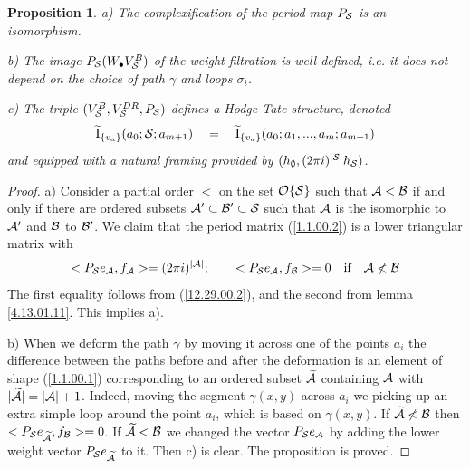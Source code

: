 \documentclass[10pt]{article}
\newtheorem{proposition}[theorem]{Proposition}
\begin{document}
\begin{proposition} \label{1.1.00.3} 
a) The complexification of the period map $P_{\cal S}$ is an isomorphism. 

b) The image $P_{{\cal S}}(W_{\bullet}{V}^{B}_{{\cal S}})$ of the weight 
filtration  is well defined,
i.e. it does not depend on the choice of path $\gamma$ and loops 
$\sigma_i$.

c) The triple $({V}^{B}_{{\cal S}}, {V}^{DR}_{{\cal S}}, P_{{\cal S}})$ defines a 
Hodge-Tate structure, 
denoted 
\begin{equation} \label{3.5.01.3}
\widetilde {\rm I}_{\{v_a\}}(a_0; {\cal S}; a_{m+1}) \quad = \quad 
\widetilde {\rm I}_{\{v_a\}}(a_0; a_1, ..., a_m; a_{m+1})
\end{equation}
 and equipped 
with a natural framing provided by $(h_{\emptyset}, (2\pi i)^{|{\cal S}|}h_{\cal S})$.
\end{proposition}

\begin{proof} a) Consider a partial order $<$ on the set ${\cal O}\{{\cal S}\}$ such that 
${\cal A} < {\cal B}$ if and only if there are ordered subsets ${\cal A}' \subset 
{\cal B}'\subset  {\cal S}$ such that ${\cal A}$ is the isomorphic to ${\cal A}'$ 
and ${\cal B}$  to ${\cal B}'$. We claim that the period matrix (\ref{1.1.00.2}) 
is a lower triangular matrix with 
\begin{equation} \label{1.2.01.2}
<P_{\cal S} e_{{\cal A}}, f_{\cal A}> = (2\pi i)^{|{\cal A}|};\qquad      <P_{\cal S} e_{{\cal A}}, f_{\cal B}> = 0 \quad \mbox{if} \quad {\cal A} \not < {\cal B}
\end{equation}
The  first equality follows from (\ref{12.29.00.2}), and the second from lemma 
\ref{4.13.01.11}. 
This implies a).
 
 
b) When we deform  the path $\gamma$ by moving it across one of the points $a_i$ 
the difference between the paths before and after the deformation is an element of  shape 
(\ref{1.1.00.1}) corresponding to an ordered subset $\widetilde {\cal A}$ containing 
${\cal A}$ with $|\widetilde {\cal A}| = |{\cal A}| +1$. Indeed, 
moving the segment $\gamma(x,y)$ across $a_i$ we picking up an extra 
simple loop around the point $a_i$, which is  based on $\gamma(x,y)$. 
If $\widetilde {\cal A} \not < {\cal B}$ then  $<P_{\cal S}e_{\widetilde {\cal A}}, 
f_{{\cal B}}> = 0$. 
If $\widetilde {\cal A}  < {\cal B}$  we changed the vector 
$P_{\cal S}e_{{\cal A}}$ by adding the lower weight vector $P_{\cal S}e_{\widetilde {\cal A}}$ to it. Then c) is clear. 
The proposition is proved. 


\end{proof}
\end{document}

